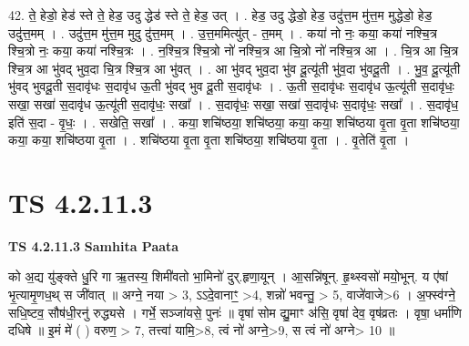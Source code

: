 \documentclass[17pt]{extarticle}
\begin{document}
42. ते॒ हेडो॒ हेड॑ स्ते ते॒ हेड॒ उदु द्धेड॑ स्ते ते॒ हेड॒ उत् । . हेड॒ उदु द्धेडो॒ हेड॒ उदु॑त्त॒म मु॑त्त॒म मुद्धेडो॒ हेड॒ उदु॑त्त॒मम् । . उदु॑त्त॒म मु॑त्त॒म मुदु दु॑त्त॒मम् । . उ॒त्त॒ममित्यु॑त् - त॒मम् । . कया॑ नो नः॒ कया॒ कया॑ नश्चि॒त्र श्चि॒त्रो नः॒ कया॒ कया॑ नश्चि॒त्रः । . न॒श्चि॒त्र श्चि॒त्रो नो॑ नश्चि॒त्र आ चि॒त्रो नो॑ नश्चि॒त्र आ । . चि॒त्र आ चि॒त्र श्चि॒त्र आ भु॑वद् भुव॒दा चि॒त्र श्चि॒त्र आ भु॑वत् । . आ भु॑वद् भुव॒दा भु॑व दू॒त्यू॑ती भु॑व॒दा भु॑वदू॒ती । . भु॒व॒ दू॒त्यू॑ती भु॑वद् भुवदू॒ती स॒दावृ॑धः स॒दावृ॑ध ऊ॒ती भु॑वद् भुव दू॒ती स॒दावृ॑धः । . ऊ॒ती स॒दावृ॑धः स॒दावृ॑ध ऊ॒त्यू॑ती स॒दावृ॑धः॒ सखा॒ सखा॑ स॒दावृ॑ध ऊ॒त्यू॑ती स॒दावृ॑धः॒ सखा᳚ । . स॒दावृ॑धः॒ सखा॒ सखा॑ स॒दावृ॑धः स॒दावृ॑धः॒ सखा᳚ । . स॒दावृ॑ध॒ इति॑ स॒दा - वृ॒धः॒ । . सखेति॒ सखा᳚ । . कया॒ शचि॑ष्ठया॒ शचि॑ष्ठया॒ कया॒ कया॒ शचि॑ष्ठया वृ॒ता वृ॒ता शचि॑ष्ठया॒ कया॒ कया॒ शचि॑ष्ठया वृ॒ता । . शचि॑ष्ठया वृ॒ता वृ॒ता शचि॑ष्ठया॒ शचि॑ष्ठया वृ॒ता । . वृ॒तेति॑ वृ॒ता । \newline
\pagebreak
{}

\section{ TS 4.2.11.3 }

\textbf{TS 4.2.11.3 } \newline
\textbf{Samhita Paata} \newline

को अ॒द्य यु॑ङ्क्ते धु॒रि गा ऋ॒तस्य॒ शिमी॑वतो भा॒मिनो॑ दुर्.हृणा॒यून् । आ॒सन्नि॑षून्. हृ॒थ्स्वसो॑ मयो॒भून्. य ए॑षां भृ॒त्यामृ॒णध॒थ् स जी॑वात् ॥ अग्ने॒ नया > 3, ऽऽदे॒वानाꣳ॒॒ >4, शन्नो॑ भवन्तु॒ > 5, वाजे॑वाजे>6 । अ॒फ्स्व॑ग्ने॒ सधि॒ष्टव॒ सौष॑धी॒रनु॑ रुद्ध्यसे । गर्भे॒ सञ्जा॑यसे॒ पुनः॑ ॥ वृषा॑ सोम द्यु॒माꣳ अ॑सि॒ वृषा॑ देव॒ वृष॑व्रतः । वृषा॒ धर्मा॑णि दधिषे ॥ इ॒मं मे॑ ( ) वरुण॒ > 7, तत्त्वा॑ यामि॒>8, त्वं नो॑ अग्ने॒>9, स त्वं नो॑ अग्ने> 10 ॥ \newline
\end{document}
